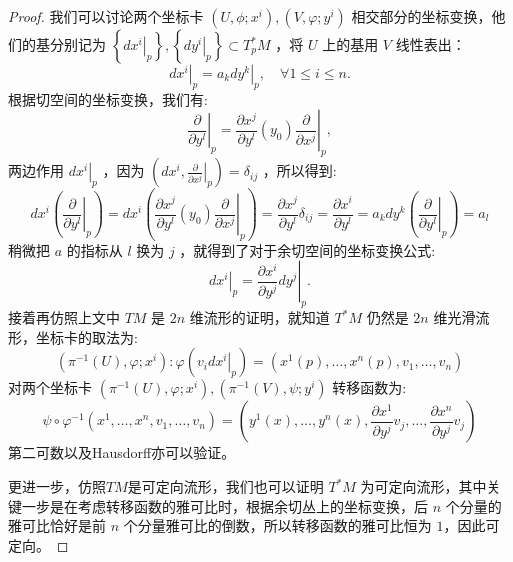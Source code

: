 \begin{proof}
    我们可以讨论两个坐标卡 $\left(U, \phi ; x^i\right),\left(V, \varphi ; y^i\right)$ 相交部分的坐标变换，他们的基分别记为 $\left\{\left.d x^i\right|_p\right\},\left\{\left.d y^i\right|_p\right\} \subset T_p^* M$ ，将 $U$ 上的基用 $V$ 线性表出：
$$
\left.d x^i\right|_p=\left.a_k d y^k\right|_p, \quad \forall 1 \leq i \leq n .
$$
根据切空间的坐标变换，我们有:
$$
\left.\frac{\partial}{\partial y^l}\right|_p=\left.\frac{\partial x^j}{\partial y^l}\left(y_0\right) \frac{\partial}{\partial x^j}\right|_p,
$$
两边作用 $\left.d x^i\right|_p$ ，因为 $\left(d x^i,\left.\frac{\partial}{\partial x^j}\right|_p\right)=\delta_{i j}$ ，所以得到:
$$
d x^i\left(\left.\frac{\partial}{\partial y^l}\right|_p\right)=d x^i\left(\left.\frac{\partial x^j}{\partial y^l}\left(y_0\right) \frac{\partial}{\partial x^j}\right|_p\right)=\frac{\partial x^j}{\partial y^l} \delta_{i j}=\frac{\partial x^i}{\partial y^l}=a_k d y^k\left(\left.\frac{\partial}{\partial y^l}\right|_p\right)=a_l
$$
稍微把 $a$ 的指标从 $l$ 换为 $j$ ，就得到了对于余切空间的坐标变换公式:
$$
\left.d x^i\right|_p=\left.\frac{\partial x^i}{\partial y^j} d y^j\right|_p .
$$
接着再仿照上文中 $T M$ 是 $2 n$ 维流形的证明，就知道 $T^* M$ 仍然是 $2 n$ 维光滑流形，坐标卡的取法为:
$$
\left(\pi^{-1}(U), \varphi ; x^i\right): \varphi\left(\left.v_i d x^i\right|_p\right)=\left(x^1(p), \ldots, x^n(p), v_1, \ldots, v_n\right)
$$
对两个坐标卡 $\left(\pi^{-1}(U), \varphi ; x^i\right),\left(\pi^{-1}(V), \psi ; y^i\right)$ 转移函数为:
$$
\psi \circ \varphi^{-1}\left(x^1, \ldots, x^n, v_1, \ldots, v_n\right)=\left(y^1(x), \ldots, y^n(x), \frac{\partial x^1}{\partial y^j} v_j, \ldots, \frac{\partial x^n}{\partial y^j} v_j\right)
$$
第二可数以及Hausdorff亦可以验证。

更进一步，仿照$TM$是可定向流形，我们也可以证明 $T^* M$ 为可定向流形，其中关键一步是在考虑转移函数的雅可比时，根据余切丛上的坐标变换，后 $n$ 个分量的雅可比恰好是前 $n$ 个分量雅可比的倒数，所以转移函数的雅可比恒为 $1$，因此可定向。
\end{proof}
